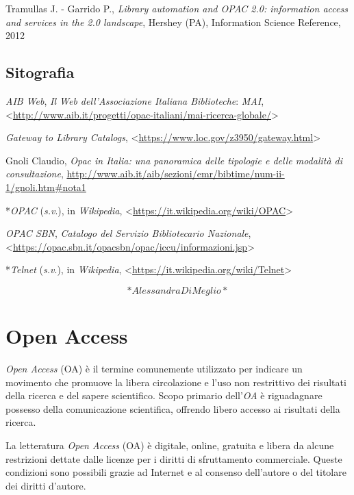 \documentclass[
  b5paper,
  twoside,
  11pt,
  chapterprefix=false,
  bibliography=totocnumbered,
  listof=flat]{scrbook}
\begin{document}
Tramullas J. - Garrido P., \emph{Library automation and OPAC 2.0: information
access and services in the 2.0 landscape}, Hershey (PA), Information
Science Reference, 2012

\hypertarget{sitografia-22}{%
\section*{Sitografia}\label{sitografia-22}}

\emph{AIB Web}, \emph{Il Web dell'Associazione Italiana Biblioteche}: \emph{MAI},
\textless{}{\url{http://www.aib.it/progetti/opac-italiani/mai-ricerca-globale/}\textgreater{}}

\emph{Gateway to Library Catalogs},
\textless{}{\url{https://www.loc.gov/z3950/gateway.html}\textgreater{}}

Gnoli Claudio, \emph{Opac in Italia: una panoramica delle tipologie e delle
modalità di consultazione},
\href{http://www.aib.it/aib/sezioni/emr/bibtime/num-ii-1/gnoli.htm\#nota1}{{http://www.aib.it/aib/sezioni/emr/bibtime/num-ii-1/gnoli.htm\#nota1}}

*\emph{OPAC} (\emph{s.v}.), in \emph{Wikipedia},
\textless{}{\url{https://it.wikipedia.org/wiki/OPAC}\textgreater{}}

\emph{OPAC SBN}, \emph{Catalogo del Servizio Bibliotecario Nazionale},
\textless{}{\url{https://opac.sbn.it/opacsbn/opac/iccu/informazioni.jsp}\textgreater{}}

*\emph{Telnet} (\emph{s.v}.), in \emph{Wikipedia},
\textless{}{\url{https://it.wikipedia.org/wiki/Telnet}\textgreater{}}

\[*Alessandra Di Meglio*\]

\hypertarget{open-access}{%
\chapter{Open Access}\label{open-access}}

\emph{Open Access} (OA) è il termine comunemente utilizzato per indicare un
movimento che promuove la libera circolazione e l'uso non restrittivo
dei risultati della ricerca e del sapere scientifico. Scopo primario
dell'\emph{OA} è riguadagnare possesso della comunicazione scientifica,
offrendo libero accesso ai risultati della ricerca.

La letteratura \emph{Open Access} (OA) è digitale, online, gratuita e libera
da alcune restrizioni dettate dalle licenze per i diritti di
sfruttamento commerciale. Queste condizioni sono possibili grazie ad
Internet e al consenso dell'autore o del titolare dei diritti
d'autore.
\end{document}
